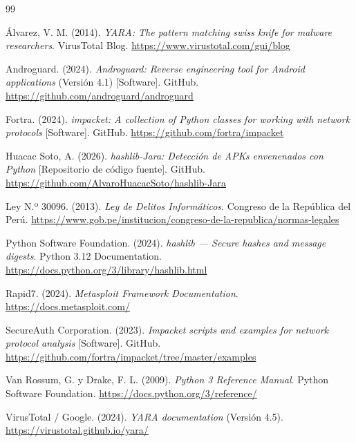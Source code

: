 \documentclass[12pt,a4paper]{article}
\begin{document}
\begin{thebibliography}{99}

Álvarez, V. M. (2014). \textit{YARA: The pattern matching swiss knife for
  malware researchers}. VirusTotal Blog.
  \url{https://www.virustotal.com/gui/blog}

Androguard. (2024). \textit{Androguard: Reverse engineering tool for Android
  applications} (Versión 4.1) [Software]. GitHub.
  \url{https://github.com/androguard/androguard}

Fortra. (2024). \textit{impacket: A collection of Python classes for working
  with network protocols} [Software]. GitHub.
  \url{https://github.com/fortra/impacket}

Huacac Soto, A. (2026). \textit{hashlib-Jara: Detección de APKs envenenados
  con Python} [Repositorio de código fuente]. GitHub.
  \url{https://github.com/AlvaroHuacacSoto/hashlib-Jara}

Ley N.º 30096. (2013). \textit{Ley de Delitos Informáticos}. Congreso de la
  República del Perú. \url{https://www.gob.pe/institucion/congreso-de-la-republica/normas-legales}

Python Software Foundation. (2024). \textit{hashlib --- Secure hashes and
  message digests}. Python 3.12 Documentation.
  \url{https://docs.python.org/3/library/hashlib.html}

Rapid7. (2024). \textit{Metasploit Framework Documentation}.
  \url{https://docs.metasploit.com/}

SecureAuth Corporation. (2023). \textit{Impacket scripts and examples for
  network protocol analysis} [Software]. GitHub.
  \url{https://github.com/fortra/impacket/tree/master/examples}

Van Rossum, G. y Drake, F. L. (2009). \textit{Python 3 Reference Manual}.
  Python Software Foundation. \url{https://docs.python.org/3/reference/}

VirusTotal / Google. (2024). \textit{YARA documentation} (Versión 4.5).
  \url{https://virustotal.github.io/yara/}

\end{thebibliography}

\end{document}

